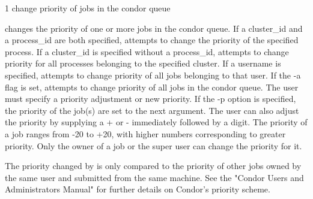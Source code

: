 \begin{ManPage}{\label{man-condor-prio}}{1}
{change priority of jobs in the condor queue} 
\Synopsis {}


\Description

 changes the priority of one or more jobs in the condor
queue.
If a cluster\_id and a process\_id are both specified, 
attempts to change the priority of the specified process.
If a cluster\_id is specified without a process\_id, 
attempts to change priority for all processes belonging to the
specified cluster.
If a username is specified,  attempts to change priority
of all jobs belonging to that user.
If the -a flag is set,  attempts to change priority of
all jobs in the condor queue.
The user must specify a priority adjustment or new priority. 
If the -p option is specified, the priority of the job(s) are set to
the next argument.
The user can also adjust the priority by supplying a + or -
immediately followed by a digit.
The priority of a job ranges from -20 to +20, with higher numbers
corresponding to greater priority.
Only the owner of a job or the super user can change the priority for
it.

The priority changed by  is only compared to the priority
of other jobs owned by the same user and submitted from the same
machine.
See the "Condor Users and Administrators Manual" for further details
on Condor's priority scheme.

\begin{Options}
\end{Options}

\end{ManPage}
